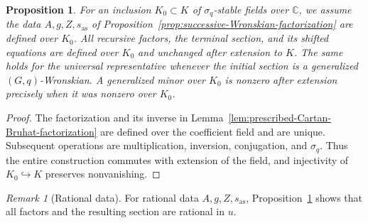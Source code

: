 \documentclass[11pt,leqno]{amsart}
\numberwithin{equation}{section}
\theoremstyle{plain}
\newtheorem{proposition}[theorem]{Proposition}
\theoremstyle{definition}
\theoremstyle{plain}
\theoremstyle{definition}
\theoremstyle{remark}
\newtheorem{remark}[theorem]{Remark}
\begin{document}
\begin{proposition}\label{prop:Wronskian-base-change}
For an inclusion $K_0\subset K$ of $\sigma_q$-stable fields over $\mathbb C$, we assume the data $A,g,Z,s_{\mathrm{as}}$ of Proposition~\ref{prop:successive-Wronskian-factorization} are defined over $K_0$.  All recursive factors, the terminal section, and its shifted equations are defined over $K_0$ and unchanged after extension to $K$.  The same holds for the universal representative whenever the initial section is a generalized $(G,q)$-Wronskian.  A generalized minor over $K_0$ is nonzero after extension precisely when it was nonzero over $K_0$.
\end{proposition}
\begin{proof}
The factorization and its inverse in Lemma~\ref{lem:prescribed-Cartan-Bruhat-factorization} are defined over the coefficient field and are unique.  Subsequent operations are multiplication, inversion, conjugation, and $\sigma_q$.  Thus the entire construction commutes with extension of the field, and injectivity of $K_0\hookrightarrow K$ preserves nonvanishing.
\end{proof}

\begin{remark}[Rational data]
For rational data $A,g,Z,s_{\mathrm{as}}$, Proposition~\ref{prop:Wronskian-base-change} shows that all factors and the resulting section are rational in $u$.
\end{remark}
\end{document}
